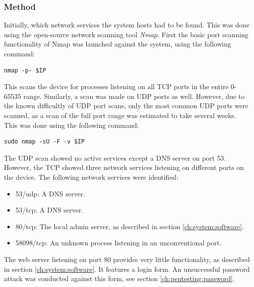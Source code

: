 \subsubsection{Method}
Initially, which network services the system hosts had to be found. This was done using the open-source network scanning tool \textit{Nmap}. First the basic port scanning functionality of Nmap was launched against the system, using the following command:
\begin{lstlisting}[frame=tb]
    nmap -p- $IP
\end{lstlisting}
This scans the device for processes listening on all TCP ports in the entire 0-65535 range. Similarly, a scan was made on UDP ports as well. However, due to the known difficultly of UDP port scans, only the most common UDP ports were scanned, as a scan of the full port range was estimated to take several weeks. This was done using the following command:
\begin{lstlisting}[frame=tb]
    sudo nmap -sU -F -v $IP
\end{lstlisting}
The UDP scan showed no active services except a DNS server on port 53. However, the TCP showed three network services listening on different ports on the device. The following network services were identified:
\begin{itemize}
    \item 53/udp: A DNS server.
    \item 53/tcp: A DNS server.
    \item 80/tcp: The local admin server, as described in section \ref{ch:system:software}.
    \item 58098/tcp: An unknown process listening in an unconventional port.
\end{itemize}
The web server listening on port 80 provides very little functionality, as described in section \ref{ch:system:software}. It features a login form. An unsuccessful password attack was conducted against this form, see section \ref{ch:pentesting:password}.

